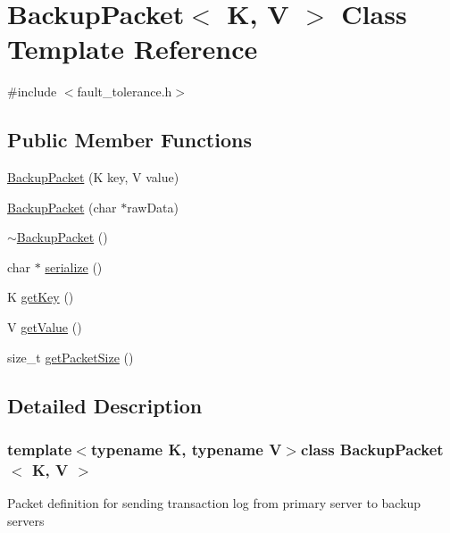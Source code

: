 \hypertarget{classBackupPacket}{\section{Backup\-Packet$<$ K, V $>$ Class Template Reference}
\label{classBackupPacket}
}


{\ttfamily \#include $<$fault\-\_\-tolerance.\-h$>$}

\subsection*{Public Member Functions}
\begin{DoxyCompactItemize}
\item 
\hyperlink{classBackupPacket_a26f60ca0db42e0bc9e7c0aa3df6e561f}{Backup\-Packet} (K key, V value)
\item 
\hyperlink{classBackupPacket_a09ccdce78d18e44e22dc3371035bed20}{Backup\-Packet} (char $\ast$raw\-Data)
\item 
\hyperlink{classBackupPacket_a81158ba89a90d03efb57d7d62f203beb}{$\sim$\-Backup\-Packet} ()
\item 
char $\ast$ \hyperlink{classBackupPacket_a626af7de776bd98ea1a322a4e9fd87bd}{serialize} ()
\item 
K \hyperlink{classBackupPacket_a36d0369d548f537a12840627a9fabbfd}{get\-Key} ()
\item 
V \hyperlink{classBackupPacket_a35e76302bebf4a0e6c871426844553fc}{get\-Value} ()
\item 
size\-\_\-t \hyperlink{classBackupPacket_a3bdc1916566a9cffbdd26abe5c87bdad}{get\-Packet\-Size} ()
\end{DoxyCompactItemize}


\subsection{Detailed Description}
\subsubsection*{template$<$typename K, typename V$>$class Backup\-Packet$<$ K, V $>$}

Packet definition for sending transaction log from primary server to backup servers 

